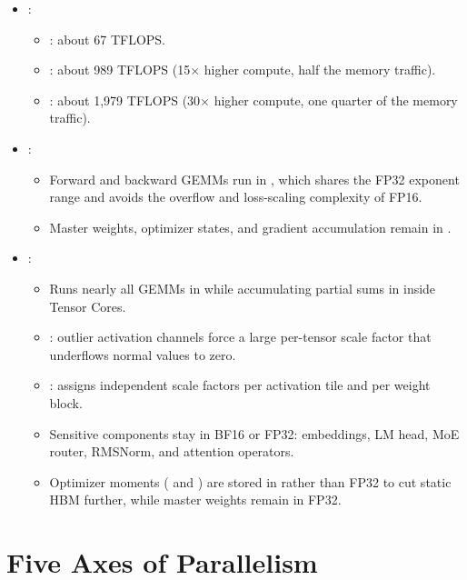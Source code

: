 \begin{itemize}
    \item {}:
    \begin{itemize}
        \item {}: about 67 TFLOPS.
        \item {}: about 989 TFLOPS (15$\times$ higher compute, half the memory traffic).
        \item {}: about 1,979 TFLOPS (30$\times$ higher compute, one quarter of the memory traffic).
    \end{itemize}
    \item {}:
    \begin{itemize}
        \item Forward and backward GEMMs run in , which shares the FP32 exponent range and avoids the overflow and loss-scaling complexity of FP16.
        \item Master weights, optimizer states, and gradient accumulation remain in .
    \end{itemize}
    \item {}:
    \begin{itemize}
        \item Runs nearly all GEMMs in  while accumulating partial sums in  inside Tensor Cores.
        \item {}: outlier activation channels force a large per-tensor scale factor that underflows normal values to zero.
        \item {}: assigns independent scale factors per  activation tile and per  weight block.
        \item Sensitive components stay in BF16 or FP32: embeddings, LM head, MoE router, RMSNorm, and attention operators.
        \item Optimizer moments ( and ) are stored in  rather than FP32 to cut static HBM further, while master weights remain in FP32.
    \end{itemize}
\end{itemize}

\section{Five Axes of Parallelism}

